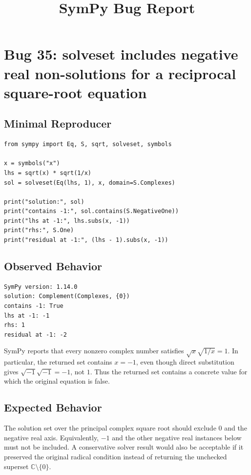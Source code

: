 \documentclass[11pt]{article}
\title{SymPy Bug Report}
\author{}
\date{}
\begin{document}
\maketitle

\section{Bug 35: solveset includes negative real non-solutions for a reciprocal square-root equation}

\subsection{Minimal Reproducer}

\medskip

\begin{lstlisting}[style=bugpython]
from sympy import Eq, S, sqrt, solveset, symbols

x = symbols("x")
lhs = sqrt(x) * sqrt(1/x)
sol = solveset(Eq(lhs, 1), x, domain=S.Complexes)

print("solution:", sol)
print("contains -1:", sol.contains(S.NegativeOne))
print("lhs at -1:", lhs.subs(x, -1))
print("rhs:", S.One)
print("residual at -1:", (lhs - 1).subs(x, -1))
\end{lstlisting}

\subsection{Observed Behavior}

\medskip

\begin{lstlisting}[style=bugpython]
SymPy version: 1.14.0
solution: Complement(Complexes, {0})
contains -1: True
lhs at -1: -1
rhs: 1
residual at -1: -2
\end{lstlisting}

SymPy reports that every nonzero complex number satisfies
\(\sqrt{x}\sqrt{1/x}=1\). In particular, the returned set contains \(x=-1\),
even though direct substitution gives \(\sqrt{-1}\sqrt{-1}=-1\), not \(1\).
Thus the returned set contains a concrete value for which the original equation
is false.

\subsection{Expected Behavior}

The solution set over the principal complex square root should exclude \(0\) and
the negative real axis. Equivalently, \(-1\) and the other negative real
instances below must not be included. A conservative solver result would also be
acceptable if it preserved the original radical condition instead of returning
the unchecked superset \(\mathbb{C}\setminus\{0\}\).
\end{document}

